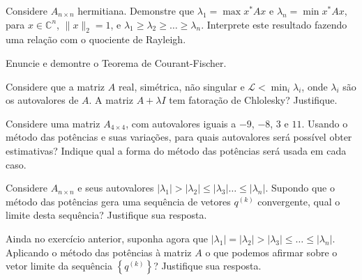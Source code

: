 \documentclass[a4paper,12pt, leqno, answers]{exam}
\begin{document}
\begin{questions}
    \question Considere $A_{n \times n}$ hermitiana. Demonstre que $\lambda_1 = \max x^* A x$ e $\lambda_n = \min x^* A x$, para $x \in \mathbb{C}^n$, $\| x \|_2 = 1$, e $\lambda_1 \geq \lambda_2 \geq \ldots \geq \lambda_n$. Interprete este resultado fazendo uma rela\c{c}\~{a}o com o quociente de Rayleigh.
    \begin{solution}
    \end{solution}

     Enuncie e demontre o Teorema de Courant-Fischer.
    \begin{solution}
    \end{solution}

    \question Considere que a matriz $A$ real, sim\'{e}trica, n\~{a}o singular e $\mathcal{L} < \min_i \lambda_i$, onde $\lambda_i$ s\~{a}o os autovalores de $A$. A matriz $A + \lambda I$ tem fatora\c{c}\~{a}o de Chlolesky? Justifique.
    \begin{solution}
    \end{solution}
    
    \question Considere uma matriz $A_{4 \times 4}$, com autovalores iguais a $-9$, $-8$, $3$ e $11$. Usando o m\'{e}todo das pot\^{e}ncias e suas varia\c{c}\~{o}es, para quais autovalores ser\'{a} poss\'{i}vel obter estimativas? Indique qual a forma do m\'{e}todo das pot\^{e}ncias ser\'{a} usada em cada caso.
    \begin{solution}
    \end{solution}

    \question Considere $A_{n \times n}$ e seus autovalores $| \lambda_1 | > | \lambda_2 | \leq | \lambda_3 | \ldots \leq | \lambda_n |$. Supondo que o m\'{e}todo das pot\^{e}ncias gera uma sequ\^{e}ncia de vetores $q^{(k)}$ convergente, qual o limite desta sequ\^{e}ncia? Justifique sua resposta.
    \begin{solution}
    \end{solution}

    \question Ainda no exerc\'{i}cio anterior, suponha agora que $| \lambda_1 | = | \lambda_2 | > | \lambda_3 | \leq \ldots \leq | \lambda_n |$. Aplicando o m\'{e}todo das pot\^{e}ncias \`{a} matriz $A$ o que podemos afirmar sobre o vetor limite da sequ\^{e}ncia $\left\{ q^{(k)} \right\}$? Justifique sua resposta.
    \begin{solution}
    \end{solution}


\end{questions}
\end{document}
